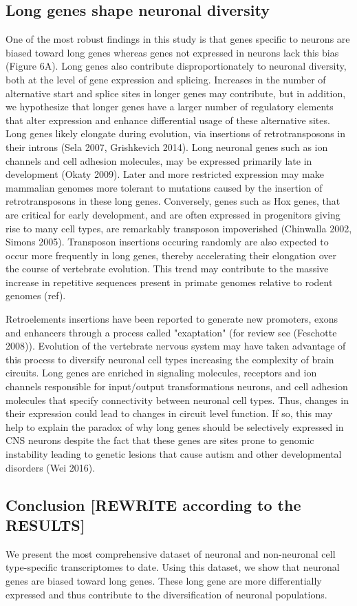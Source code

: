\subsection{Long genes shape neuronal diversity}
One of the most robust findings in this study is that genes specific to neurons are biased toward long genes whereas genes not expressed in neurons lack this bias (Figure 6A). Long genes also contribute disproportionately to neuronal diversity, both at the level of gene expression and splicing. Increases in the number of alternative start and splice sites in longer genes may contribute, but in addition, we hypothesize that longer genes have a larger number of regulatory elements that alter expression and enhance differential usage of these alternative sites. Long genes likely elongate during evolution, via insertions of retrotransposons in their introns (Sela 2007, Grishkevich 2014). Long neuronal genes such as ion channels and cell adhesion molecules, may be expressed primarily late in development (Okaty 2009). Later and more restricted expression may make mammalian genomes more tolerant to mutations caused by the insertion of retrotransposons in these long genes. Conversely, genes such as Hox genes, that are critical for early development, and are often expressed in progenitors giving rise to many cell types, are remarkably transposon impoverished (Chinwalla 2002, Simons 2005). Transposon insertions occuring randomly are also expected to occur more frequently in long genes, thereby accelerating their elongation over the course of vertebrate evolution. This trend may contribute to the massive increase in repetitive sequences present in primate genomes relative to rodent genomes (ref).

Retroelements insertions have been reported to generate new promoters, exons and enhancers through a process called "exaptation" (for review see (Feschotte 2008)). Evolution of the vertebrate nervous system may have taken advantage of this process to diversify neuronal cell types increasing the complexity of brain circuits. Long genes are enriched in signaling molecules, receptors and ion channels responsible for input/output transformations neurons, and cell adhesion molecules that specify connectivity between neuronal cell types. Thus, changes in their expression could lead to changes in circuit level function. If so, this may help to explain the paradox of why long genes should be selectively expressed in CNS neurons despite the fact that these genes are sites prone to genomic instability leading to genetic lesions that cause autism and other developmental disorders (Wei 2016).

\subsection{Conclusion [REWRITE according to the RESULTS]}
We present the most comprehensive dataset of neuronal and non-neuronal cell type-specific transcriptomes to date. Using this dataset, we show that neuronal genes are biased toward long genes. These long gene are more differentially expressed and thus contribute to the diversification of neuronal populations.
